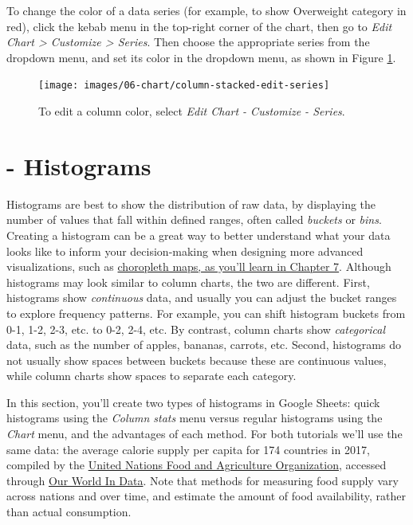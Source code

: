 \documentclass[
  english,
]{book}
\begin{document}
To change the color of a data series (for example, to show Overweight category in red), click the kebab menu in the top-right corner of the chart, then go to \emph{Edit Chart \textgreater{} Customize \textgreater{} Series}. Then choose the appropriate series from the dropdown menu, and set its color in the dropdown menu, as shown in Figure \ref{fig:column-stacked-edit-series}.



\begin{figure}
\texttt{[image: images/06-chart/column-stacked-edit-series]} \caption{To edit a column color, select \emph{Edit Chart - Customize - Series}.}\label{fig:column-stacked-edit-series}
\end{figure}

\hypertarget{histogram-google}{%
\section*{- Histograms}\label{histogram-google}}

Histograms are best to show the distribution of raw data, by displaying the number of values that fall within defined ranges, often called \emph{buckets} or \emph{bins}. Creating a histogram can be a great way to better understand what your data looks like to inform your decision-making when designing more advanced visualizations, such as \href{design-choropleth.html}{choropleth maps, as you'll learn in Chapter 7}. Although histograms may look similar to column charts, the two are different. First, histograms show \emph{continuous} data, and usually you can adjust the bucket ranges to explore frequency patterns. For example, you can shift histogram buckets from 0-1, 1-2, 2-3, etc. to 0-2, 2-4, etc. By contrast, column charts show \emph{categorical} data, such as the number of apples, bananas, carrots, etc. Second, histograms do not usually show spaces between buckets because these are continuous values, while column charts show spaces to separate each category.

In this section, you'll create two types of histograms in Google Sheets: quick histograms using the \emph{Column stats} menu versus regular histograms using the \emph{Chart} menu, and the advantages of each method. For both tutorials we'll use the same data: the average calorie supply per capita for 174 countries in 2017, compiled by the \href{http://www.fao.org/faostat/en/\#data/FBS}{United Nations Food and Agriculture Organization}, accessed through \href{https://ourworldindata.org/food-supply}{Our World In Data}. Note that methods for measuring food supply vary across nations and over time, and estimate the amount of food availability, rather than actual consumption.
\end{document}
